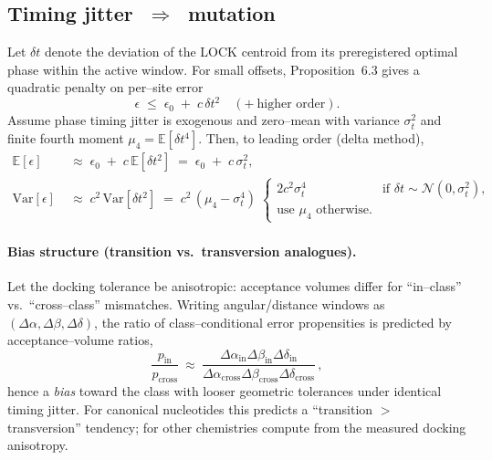 \documentclass[11pt]{article}
\begin{document}
\subsection{Timing jitter $\;\Rightarrow\;$ mutation}\label{sec:jitter-mutation}
Let $\delta t$ denote the deviation of the LOCK centroid from its preregistered optimal phase within the active window. For small offsets, Proposition~6.3 gives a quadratic penalty on per–site error
\[
\epsilon\;\le\;\epsilon_0\;+\;c\,\delta t^2\quad(+\ \text{higher order}).
\]
Assume phase timing jitter is exogenous and zero–mean with variance $\sigma_t^2$ and finite fourth moment $\mu_4=\mathbb{E}[\delta t^4]$. Then, to leading order (delta method),
\begin{align*}
\mathbb{E}[\epsilon]
&\;\approx\;\epsilon_0\;+\;c\,\mathbb{E}[\delta t^2]
\;=\;\epsilon_0\;+\;c\,\sigma_t^2,\\
\mathrm{Var}[\epsilon]
&\;\approx\;c^2\,\mathrm{Var}[\delta t^2]
\;=\;c^2\,(\mu_4-\sigma_t^4)
\;\begin{cases}
2c^2\sigma_t^4 & \text{if }\delta t\sim\mathcal{N}(0,\sigma_t^2),\\
\text{use }\mu_4\text{ otherwise.}
\end{cases}
\end{align*}
\paragraph{Bias structure (transition vs.\ transversion analogues).}
Let the docking tolerance be anisotropic: acceptance volumes differ for “in–class” vs.\ “cross–class” mismatches. Writing angular/distance windows as $(\Delta\alpha,\Delta\beta,\Delta\delta)$, the ratio of class–conditional error propensities is predicted by acceptance–volume ratios,
\[
\frac{p_{\mathrm{in}}}{p_{\mathrm{cross}}}\ \approx\
\frac{\Delta\alpha_{\mathrm{in}}\Delta\beta_{\mathrm{in}}\Delta\delta_{\mathrm{in}}}%
{\Delta\alpha_{\mathrm{cross}}\Delta\beta_{\mathrm{cross}}\Delta\delta_{\mathrm{cross}}}\,,
\]
hence a \emph{bias} toward the class with looser geometric tolerances under identical timing jitter. For canonical nucleotides this predicts a “transition $>$ transversion” tendency; for other chemistries compute from the measured docking anisotropy.
\end{document}
